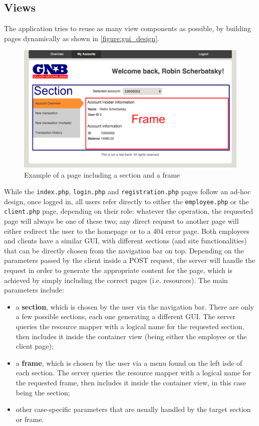 \subsection{Views}\label{subsection:views}
The application tries to reuse as many view components as possible, by building pages dynamically as shown in \autoref{figure:gui_design}.
\begin{figure}[h!tbp]
	\centering
	\includegraphics[width=\textwidth]{figures/gui_design}
	\caption{Example of a page including a section and a frame}
	\label{figure:gui_design}
\end{figure}
While the \texttt{index.php}, \texttt{login.php} and \texttt{registration.php} pages follow an ad-hoc design, once logged in, all users refer directly to either the \texttt{employee.php} or the \texttt{client.php} page, depending on their role: whatever the operation, the requested page will always be one of these two; any direct request to another page will either redirect the user to the homepage or to a 404 error page. Both employees and clients have a similar GUI, with different sections (and site functionalities) that can be directly chosen from the navigation bar on top.\newline
Depending on the parameters passed by the client inside a POST request, the server will handle the request in order to generate the appropriate content for the page, which is achieved by simply including the correct pages (i.e. resources). The main parameters include:
\begin{itemize}
	\item a \textbf{section}, which is chosen by the user via the navigation bar. There are only a few possible sections, each one generating a different GUI. The server queries the resource mapper with a logical name for the requested section, then includes it inside the container view (being either the employee or the client page);
	\item a \textbf{frame}, which is chosen by the user via a menu found on the left isde of each section. The server queries the resource mapper with a logical name for the requested frame, then includes it inside the container view, in this case being the section;
	\item other case-specific parameters that are usually handled by the target section or frame.
\end{itemize}
